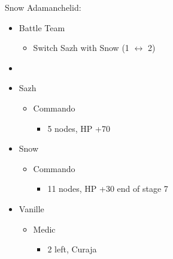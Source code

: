 \begin{multicols}{2}
\begin{center}
Snow Adamanchelid:
\end{center}
\begin{menu}
\begin{itemize}
    \paradigm
    \begin{itemize}
        \item Battle Team
        \begin{itemize}
            \item Switch Sazh with Snow (1 $\leftrightarrow$ 2)
        \end{itemize}
        \item {}%
{\paradigmline{(\rav)}{\com}{\com}}%
{\paradigmline[2]{\textit{\com}}{\textit{\com}}{\textit{\com}}}%
{\paradigmline{(\rav)}{\sen}{(\rav)}}%
{\paradigmline{(\com)}{(\sen)}{\med}}%
{\paradigmline{\rav}{(\com)}{(\rav)}}%
{\paradigmline{\rav}{\rav}{\rav}}
    \end{itemize}
    \crystarium
    \begin{itemize}
        \item Sazh
        \begin{itemize}
            \item Commando
            \begin{itemize}
                \item 5 nodes, HP +70
            \end{itemize}
        \end{itemize}
        \item Snow
        \begin{itemize}
            \item Commando
            \begin{itemize}
                \item 11 nodes, HP +30 end of stage 7
            \end{itemize}
        \end{itemize}
        \item Vanille
        \begin{itemize}
            \item Medic
            \begin{itemize}
                \item 2 left, Curaja
            \end{itemize}
        \end{itemize}
    \end{itemize}

\end{itemize}
\end{menu}
\end{multicols}
